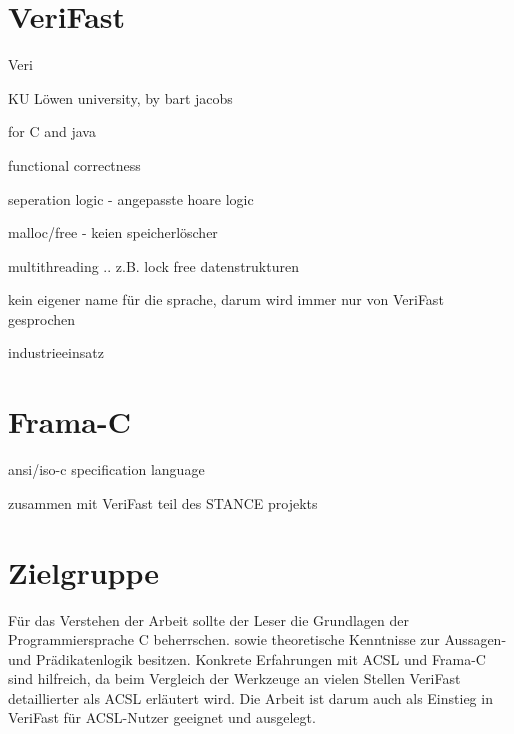 \section{VeriFast}
\label{sec:VeriFast}

Veri

KU Löwen university, by bart jacobs


for C and java


functional correctness


seperation logic - angepasste hoare logic


malloc/free - keien speicherlöscher


multithreading .. z.B. lock free datenstrukturen

kein eigener name für die sprache, darum wird immer nur von VeriFast gesprochen


industrieeinsatz

\section{Frama-C}
\label{acsl-und-frama-c}

ansi/iso-c specification language


zusammen mit VeriFast teil des STANCE projekts

\section{Zielgruppe}
\label{sec:zielgruppe}

Für das Verstehen der Arbeit sollte der Leser die Grundlagen der Programmiersprache C beherrschen.
sowie theoretische Kenntnisse zur Aussagen- und Prädikatenlogik besitzen.
Konkrete Erfahrungen mit ACSL und Frama-C sind hilfreich, da beim Vergleich der Werkzeuge an vielen
Stellen VeriFast detaillierter als ACSL erläutert wird. Die Arbeit ist darum auch als Einstieg in VeriFast
für ACSL-Nutzer geeignet und ausgelegt.

 

